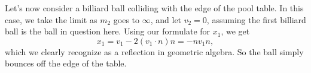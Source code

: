 \documentclass[12pt]{article}
\begin{document}
Let's now consider a billiard ball colliding with the edge of the pool table.  In this case, we take the limit
as $m_2$ goes to $\infty$, and let $v_2=0$, assuming the first billiard ball is the ball in question here.
Using our formulate for $x_1$, we get
\begin{equation*}
x_1 = v_1 - 2(v_1\cdot n)n = -nv_1n,
\end{equation*}
which we clearly recognize as a reflection in geometric algebra.  So the ball simply bounces off the edge of the table.
\end{document}
